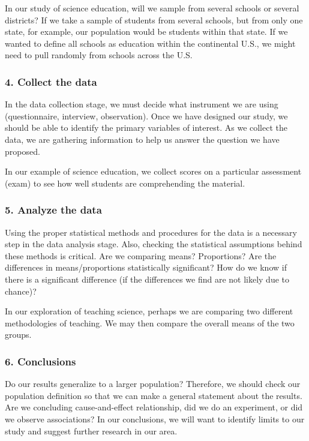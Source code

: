 \documentclass[11pt]{book}\usepackage[]{graphicx}\usepackage[]{color}
\begin{document}
In our study of science education, will we sample from several schools or several districts?  If we take a sample of students from several schools, but from only one state, for example, our population would be students within that state.  If we wanted to define all schools as education within the continental U.S., we might need to pull randomly from schools across the U.S.

\subsubsection{4. Collect the data}

In the data collection stage, we must decide what instrument we are using (questionnaire, interview, observation).  Once we have designed our study, we should be able to identify the primary variables of interest.  As we collect the data, we are gathering information to help us answer the question we have proposed.

In our example of science education, we collect scores on a particular assessment (exam) to see how well students are comprehending the material.

\subsubsection{5. Analyze the data}

Using the proper statistical methods and procedures for the data is a necessary step in the data analysis stage.  Also, checking the statistical assumptions behind these methods is critical.  Are we comparing means?  Proportions?  Are the differences in means/proportions statistically significant?  How do we know if there is a significant difference (if the differences we find are not likely due to chance)?

In our exploration of teaching science, perhaps we are comparing two different methodologies of teaching.  We may then compare the overall means of the two groups.

\subsubsection{6. Conclusions}

Do our results generalize to a larger population?  Therefore, we should check our population definition so that we can make a general statement about the results.  Are we concluding cause-and-effect relationship, did we do an experiment, or did we observe associations?  In our conclusions, we will want to identify limits to our study and suggest further research in our area.
\end{document}
